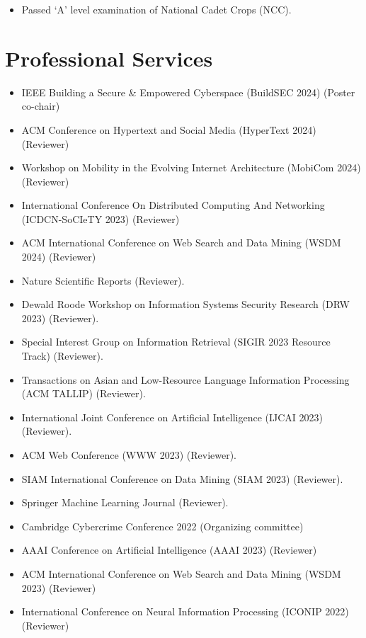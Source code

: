 \documentclass[margin, centered,lmodern]{res}
\begin{document}
\begin{resume}
\begin{itemize}[leftmargin=*]
 \item Passed `A' level examination of National Cadet Crops (NCC).
\end{itemize}

\section{Professional Services}
\begin{itemize}[leftmargin=*]
\item IEEE Building a Secure & Empowered Cyberspace (BuildSEC 2024) (Poster co-chair)
\item ACM Conference on Hypertext and Social Media (HyperText 2024) (Reviewer)
\item Workshop on Mobility in the Evolving Internet Architecture (MobiCom 2024) (Reviewer)
\item International Conference On Distributed Computing And Networking (ICDCN-SoCIeTY 2023) (Reviewer)
\item ACM International Conference on Web Search and Data Mining (WSDM 2024) (Reviewer)
\item Nature Scientific Reports (Reviewer).
\item Dewald Roode Workshop on Information Systems Security Research (DRW 2023) (Reviewer).
\item Special Interest Group on Information Retrieval (SIGIR 2023 Resource Track) (Reviewer).
\item Transactions on Asian and Low-Resource Language Information Processing (ACM TALLIP) (Reviewer).
\item International Joint Conference on Artificial Intelligence (IJCAI 2023) (Reviewer).
\item ACM Web Conference (WWW 2023) (Reviewer).
\item SIAM International Conference on Data Mining (SIAM 2023) (Reviewer).
\item Springer Machine Learning Journal (Reviewer).
\item Cambridge Cybercrime Conference 2022 (Organizing committee)
\item AAAI Conference on Artificial Intelligence (AAAI 2023) (Reviewer)
\item ACM International Conference on Web Search and Data Mining (WSDM 2023) (Reviewer)
\item International Conference on Neural Information Processing (ICONIP 2022) (Reviewer)

\end{itemize}
\end{resume}
\end{document}
